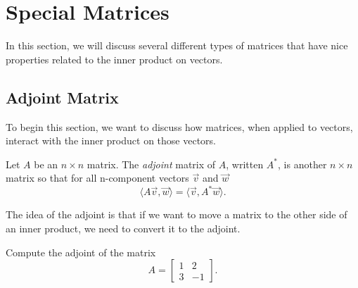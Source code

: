\section{Special Matrices} \label{specmat:section}



In this section, we will discuss several different types of matrices that have nice properties related to the inner product on vectors. 

\subsection{Adjoint Matrix}

To begin this section, we want to discuss how matrices, when applied to vectors, interact with the inner product on those vectors. 

\begin{definition}
Let $A$ be an $n \times n$ matrix. The \emph{adjoint} matrix of $A$, written $A^*$, is another $n \times n$ matrix so that for all n-component vectors $\vec{v}$ and $\vec{w}$
\[ \langle A\vec{v} , \vec{w} \rangle = \langle \vec{v}, A^*\vec{w} \rangle.\]
\end{definition}

The idea of the adjoint is that if we want to move a matrix to the other side of an inner product, we need to convert it to the adjoint. 

\begin{example}
Compute the adjoint of the matrix
\[ A = \begin{bmatrix} 1 & 2 \\ 3 & -1 \end{bmatrix}. \]
\end{example}

